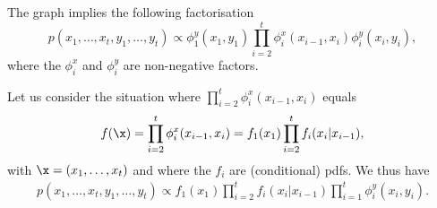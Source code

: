 The graph implies the following factorisation
\begin{equation}
  p( x_1, \ldots, x_t,y_1, \ldots, y_t) \propto \phi_1^y(x_1, y_1) \prod_{i=2}^t \phi_i^x(x_{i-1}, x_i) \phi_i^y(x_i, y_i),
\end{equation}
where  the $\phi_i^x$ and $\phi_i^y$ are non-negative factors.

Let us consider the situation where $\prod_{i=2}^t \phi^x_i(x_{i-1}, x_i)$ equals
\begin{equation}
  f(\x) = \prod_{i=2}^t \phi^x_i(x_{i-1}, x_i) = f_1(x_1) \prod_{i=2}^t f_i(x_i|x_{i-1}),
\end{equation}
with $\x=(x_1, \ldots, x_t)$ and where the $f_i$ are (conditional) pdfs. We thus have
\begin{align}
  p(x_1, \ldots, x_t, y_1, \ldots, y_t) \propto f_1(x_1) \prod_{i=2}^t f_i(x_i|x_{i-1}) \prod_{i=1}^t \phi_i^y(x_i, y_i).
  \label{eq:Markov-model-joint-def} 
\end{align}

